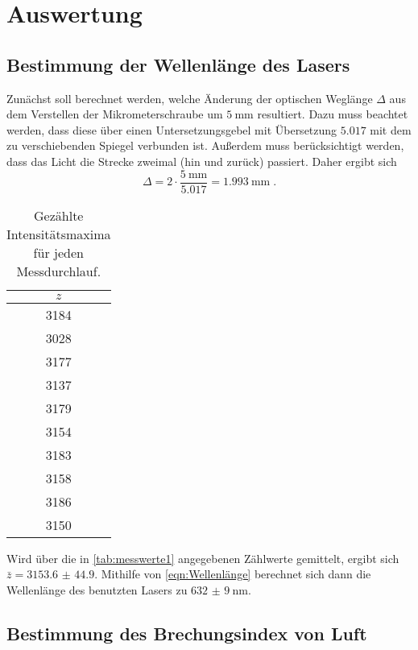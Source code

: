 \section{Auswertung}

\subsection{Bestimmung der Wellenlänge des Lasers}
\label{sec:auswertung:wellenlaenge}

Zunächst soll berechnet werden,
welche Änderung der optischen Weglänge $\Delta$
aus dem Verstellen der Mikrometerschraube um $\SI{5}{\milli\meter}$ resultiert.
Dazu muss beachtet werden,
dass diese über einen Untersetzungsgebel mit Übersetzung $\num{5.017}$
mit dem zu verschiebenden Spiegel verbunden ist.
Außerdem muss berücksichtigt werden,
dass das Licht die Strecke zweimal (hin und zurück) passiert.
Daher ergibt sich
\begin{equation*}
  \Delta = 2 \cdot \frac{\SI{5}{\milli\meter}}{\num{5.017}} = \SI{1.993}{\milli\meter} \; .
\end{equation*}

\begin{table}[H]
  \centering
  \caption{Gezählte Intensitätsmaxima für jeden Messdurchlauf.}
  \label{tab:messwerte1}
  \begin{tabular}{c}
  \toprule
  $z$ \\
  \midrule
  3184 \\
  3028 \\
  3177 \\
  3137 \\
  3179 \\
  3154 \\
  3183 \\
  3158 \\
  3186 \\
  3150 \\
  \bottomrule
  \end{tabular}
\end{table}

Wird über die in \autoref{tab:messwerte1} angegebenen Zählwerte gemittelt,
ergibt sich $\bar{z} = \num{3153.6(449)}$.
Mithilfe von \autoref{eqn:Wellenlänge} berechnet sich dann die Wellenlänge des benutzten Lasers zu
$\SI{632(9)}{\nano\meter}$.

\subsection{Bestimmung des Brechungsindex von Luft}
\label{sec:auswertung:brechungsindex}

